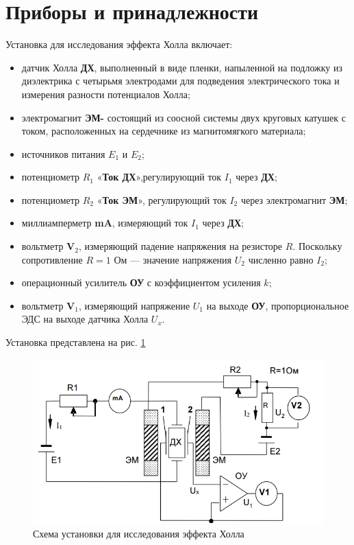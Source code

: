 \section*{Приборы и принадлежности}

Установка для исследования эффекта Холла включает:

\begin{itemize}
	\item датчик Холла \textbf{ДХ}, выполненный в виде пленки, напыленной на подложку из диэлектрика с четырьмя электродами для подведения электрического тока и измерения разности потенциалов Холла;
	\item электромагнит \textbf{ЭМ-} состоящий из соосной системы двух круговых катушек с током, расположенных на
	сердечнике из магнитомягкого материала;
	\item источников питания $ E_1 $ и $ E_2 $;
	\item потенциометр $ R_1 $ «\textbf{Ток ДХ}»,регулирующий ток $ I_1 $ через \textbf{ДХ};
	\item потенциометр $ R_2 $ «\textbf{Ток ЭМ}», регулирующий ток $ I_2 $ через электромагнит \textbf{ЭМ};
	\item миллиамперметр \textbf{mA}, измеряющий ток $ I_1 $ через \textbf{ДХ};
	\item вольтметр \textbf{V}$_2$, измеряющий падение напряжения на резисторе $ R $. Поскольку сопротивление $ R = 1 $ Ом ---
	значение напряжения $ U_2 $ численно равно $ I_2 $;
	\item операционный усилитель \textbf{ОУ} с коэффициентом усиления $ k $;
	\item вольтметр \textbf{V}$_1$, измеряющий напряжение $ U_1 $ на выходе \textbf{ОУ}, пропорциональное ЭДС на выходе датчика Холла
	$ U_x $. 

\end{itemize}

\newpage

Установка представлена на рис. \ref{schema}

\begin{figure}[hpt!]
	\centering
	\includegraphics[width=0.8\linewidth]{photo/schema}
	\caption{Схема установки для исследования эффекта Холла}
	\label{schema}
\end{figure}

